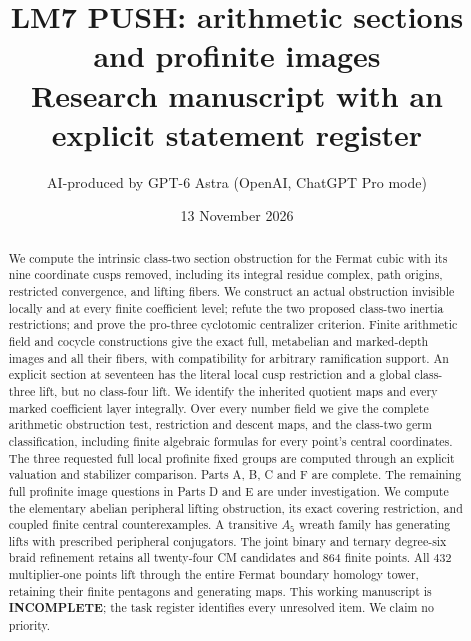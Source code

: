 \documentclass[11pt,a4paper]{article}
\title{LM7 PUSH: arithmetic sections and profinite images\\\large Research manuscript with an explicit statement register}
\author{AI-produced by GPT-6 Astra (OpenAI, ChatGPT Pro mode)}
\date{13 November 2026}
\begin{document}
\maketitle
\begin{abstract}
We compute the intrinsic class-two section obstruction for the Fermat cubic with its nine coordinate cusps removed, including its integral residue complex, path origins, restricted convergence, and lifting fibers. We construct an actual obstruction invisible locally and at every finite coefficient level; refute the two proposed class-two inertia restrictions; and prove the pro-three cyclotomic centralizer criterion. Finite arithmetic field and cocycle constructions give the exact full, metabelian and marked-depth images and all their fibers, with compatibility for arbitrary ramification support. An explicit section at seventeen has the literal local cusp restriction and a global class-three lift, but no class-four lift. We identify the inherited quotient maps and every marked coefficient layer integrally. Over every number field we give the complete arithmetic obstruction test, restriction and descent maps, and the class-two germ classification, including finite algebraic formulas for every point's central coordinates. The three requested full local profinite fixed groups are computed through an explicit valuation and stabilizer comparison. Parts A, B, C and F are complete. The remaining full profinite image questions in Parts D and E are under investigation. We compute the elementary abelian peripheral lifting obstruction, its exact covering restriction, and coupled finite central counterexamples. A transitive $A_5$ wreath family has generating lifts with prescribed peripheral conjugators. The joint binary and ternary degree-six braid refinement retains all twenty-four CM candidates and $864$ finite points. All $432$ multiplier-one points lift through the entire Fermat boundary homology tower, retaining their finite pentagons and generating maps. This working manuscript is \textbf{INCOMPLETE}; the task register identifies every unresolved item. We claim no priority.
\end{abstract}
\tableofcontents
\end{document}
